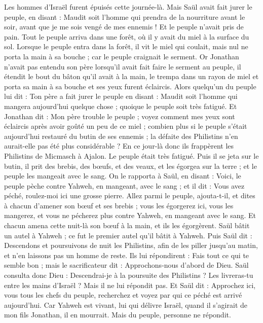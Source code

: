 \begin{multicols}{2}
Les hommes d'Israël furent épuisés cette journée-là. Mais Saül avait fait jurer le peuple, en disant : Maudit soit l'homme qui prendra de la nourriture avant le soir, avant que je me sois vengé de mes ennemis ! Et le peuple n’avait pris de pain.
Tout le peuple arriva dans une forêt, où il y avait du miel à la surface du sol.
Lorsque le peuple entra dans la forêt, il vit le miel qui coulait, mais nul ne porta la main à sa bouche ; car le peuple craignait le serment.
Or Jonathan n'avait pas entendu son père lorsqu'il avait fait faire le serment au peuple, il étendit le bout du bâton qu'il avait à la main, le trempa dans un rayon de miel et porta sa main à sa bouche et ses yeux furent éclaircis.
Alors quelqu'un du peuple lui dit : Ton père a fait jurer le peuple en disant : Maudit soit l'homme qui mangera aujourd'hui quelque chose ; quoique le peuple soit très fatigué.
Et Jonathan dit : Mon père trouble le peuple ; voyez comment mes yeux sont éclaircis après avoir goûté un peu de ce miel ;
combien plus si le peuple s’était aujourd'hui restauré du butin de ses ennemis ; la défaite des Philistins n'en aurait-elle pas été plus considérable ?
En ce jour-là donc ils frappèrent les Philistins de Micmasch à Ajalon. Le peuple était très fatigué.
Puis il se jeta sur le butin, il prit des brebis, des bœufs, et des veaux, et les égorgea sur la terre ; et le peuple les mangeait avec le sang.
On le rapporta à Saül, en disant : Voici, le peuple pèche contre Yahweh, en mangeant, avec le sang ; et il dit : Vous avez péché, roulez-moi ici une grosse pierre.
Allez parmi le peuple, ajouta-t-il, et dites à chacun d’amener son bœuf et ses brebis ; vous les égorgerez ici, vous les mangerez, et vous ne pécherez plus contre Yahweh, en mangeant avec le sang. Et chacun amena cette nuit-là son bœuf à la main, et ils les égorgèrent.
Saül bâtit un autel à Yahweh ; ce fut le premier autel qu'il bâtit à Yahweh.
Puis Saül dit : Descendons et poursuivons de nuit les Philistins, afin de les piller jusqu'au matin, et n’en laissons pas un homme de reste. Ils lui répondirent : Fais tout ce qui te semble bon ; mais le sacrificateur dit : Approchons-nous d’abord de Dieu.
Saül consulta donc Dieu : Descendrai-je à la poursuite des Philistins ? Les livreras-tu entre les mains d'Israël ? Mais il ne lui répondit pas.
Et Saül dit : Approchez ici, vous tous les chefs du peuple, recherchez et voyez par qui ce péché est arrivé aujourd'hui.
Car Yahweh est vivant, lui qui délivre Israël, quand il s’agirait de mon fils Jonathan, il en mourrait. Mais du peuple, personne ne répondit.

\end{multicols}

